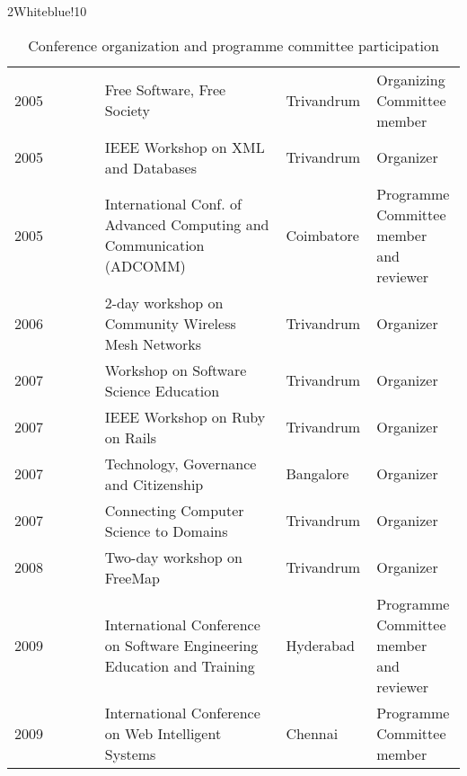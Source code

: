 \documentclass[titlepage, %
11pt, 
]{article}
\begin{document}
\begin{table}
\begin{minipage}{1.0\linewidth}
\rowcolors%
{2}{White}{blue!10}
\setlength\extrarowheight{4pt}
\begin{tabular}%
{|p{0.20\linewidth}|p{0.40\linewidth}|p{0.20\linewidth}|p{0.20\linewidth}|}
\hline
\multicolumn{1}{|m{0.20\linewidth}|}{\centering {\bf Year}}&
\multicolumn{1}{m{0.40\linewidth}|}{\centering {\bf Conference or Workshop}}&
\multicolumn{1}{m{0.20\linewidth}|}{\centering {\bf Location or Publisher}}&
\multicolumn{1}{m{0.20\linewidth}|}{\centering {\bf Role}}\\
\hline
2005 & Free Software, Free Society & Trivandrum & Organizing Committee member\\
2005 & IEEE Workshop on XML and Databases & Trivandrum & Organizer\\
2005 & International Conf. of Advanced Computing and Communication (ADCOMM) & Coimbatore & Programme Committee member and reviewer\\
2006 & 2-day workshop on Community Wireless Mesh Networks & Trivandrum & Organizer\\
2007 & Workshop on Software Science Education & Trivandrum & Organizer\\
2007 & IEEE Workshop on Ruby on Rails & Trivandrum & Organizer\\
2007 & Technology, Governance and Citizenship & Bangalore & Organizer\\
2007 & Connecting Computer Science to Domains & Trivandrum & Organizer\\
2008 & Two-day workshop on FreeMap & Trivandrum & Organizer\\
2009 & International Conference on Software Engineering Education and Training& Hyderabad & Programme Committee member and reviewer\\
2009 & International Conference on Web Intelligent Systems& Chennai & Programme Committee member\\
\hline
\end{tabular}
\end{minipage}
\caption{Conference organization and programme committee participation\label{tbl:conf-organized}}
\end{table}
\end{document}
